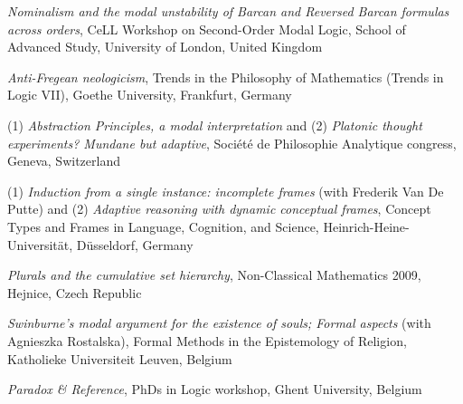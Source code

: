 \documentclass[10pt, a4paper]{article}
\newcommand{\years}[1]{\marginnote{\normalsize #1}}
\begin{document}
  \emph{Nominalism and the modal unstability of Barcan and Reversed Barcan formulas across orders},     CeLL Workshop on Second-Order Modal Logic,  School of Advanced Study, University of London, United Kingdom

\vspace{0.5mm}



  \years{2009} \emph{Anti-Fregean neologicism}, Trends in the Philosophy of Mathematics (Trends in Logic VII),     Goethe University, Frankfurt, Germany


\vspace{0.5mm}


  (1) \emph{Abstraction Principles, a modal interpretation} and (2)   \emph{Platonic  thought   experiments?  Mundane   but  adaptive}, Soci\'et\'e de Philosophie Analytique  congress, 
    Geneva, Switzerland


\vspace{0.5mm}



(1)  \emph{Induction from a single instance: incomplete frames} (with Frederik Van De Putte) and (2)   \emph{Adaptive reasoning with dynamic conceptual frames},
  Concept Types and Frames in Language, Cognition, and Science,      Heinrich-Heine-Universit\" at, D\"usseldorf, Germany


\vspace{0.5mm}




 \emph{Plurals and the cumulative set hierarchy},   Non-Classical Mathematics 2009,    Hejnice, Czech Republic


\vspace{0.5mm}


\emph{Swinburne's modal argument for the existence of souls; Formal aspects} (with Agnieszka Rostalska),  Formal Methods in the Epistemology of Religion,   Katholieke Universiteit Leuven, Belgium


\vspace{0.5mm}




  \emph{Paradox \& Reference},   PhDs in Logic workshop,    Ghent University, Belgium


\vspace{0.5mm}

\end{document}
